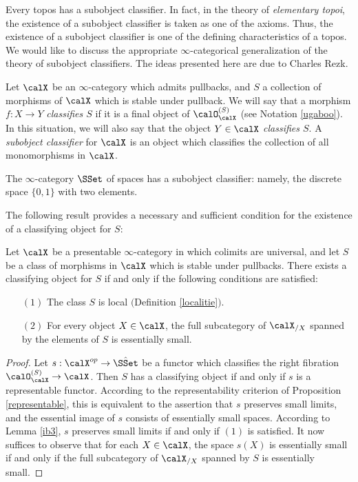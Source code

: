 Every topos has a subobject classifier. In fact, in the theory of {\it elementary topoi}, the existence of a subobject classifier is taken as one of the axioms. Thus, the existence of a subobject classifier is one of the defining characteristics of a topos. We would like to discuss the appropriate $\infty$-categorical generalization of the theory of subobject classifiers. The ideas presented here are due to Charles Rezk.

\begin{definition}\label{ugatoo}
Let $\calX$ be an $\infty$-category which admits pullbacks, and $S$ a collection of morphisms
of $\calX$ which is stable under pullback. We will say that a morphism $f: X \rightarrow Y$ {\it classifies $S$} if it is a final object of $\calO_{\calX}^{(S)}$ (see Notation \ref{ugaboo}). 
In this situation, we will also say that the object $Y \in \calX$ {\it classifies $S$}. 
A {\it subobject classifier} for $\calX$ is an object which classifies the collection of all monomorphisms in $\calX$.
\end{definition}

\begin{example}
The $\infty$-category $\SSet$ of spaces has a subobject classifier: namely, the discrete space $\{ 0, 1\}$ with two elements.
\end{example}

The following result provides a necessary and sufficient condition for the existence of a classifying object for $S$: 

\begin{proposition}\label{classexist}
Let $\calX$ be a presentable $\infty$-category in which colimits are universal, and let $S$
be a class of morphisms in $\calX$ which is stable under pullbacks. There exists a classifying object for $S$ if and only if the following conditions are satisfied:
\begin{itemize}
\item[$(1)$] The class $S$ is local $($Definition \ref{localitie}$)$.
\item[$(2)$] For every object $X \in \calX$, the full subcategory of
$\calX_{/X}$ spanned by the elements of $S$ is essentially small.
\end{itemize}
\end{proposition}

\begin{proof}
Let $s: \calX^{op} \rightarrow \hat{\SSet}$ be a functor which classifies the right fibration
$\calO_{\calX}^{(S)} \rightarrow \calX$. Then $S$ has a classifying object if and only if
$s$ is a representable functor. According to the representability criterion of Proposition \ref{representable}, this is equivalent to the assertion that $s$ preserves small limits, and the essential image of $s$ consists of essentially small spaces. According to Lemma \ref{ib3}, $s$ preserves small limits if and only if $(1)$ is satisfied. It now suffices to observe that for each
$X \in \calX$, the space $s(X)$ is essentially small if and only if the full subcategory of
$\calX_{/X}$ spanned by $S$ is essentially small. 
\end{proof}

